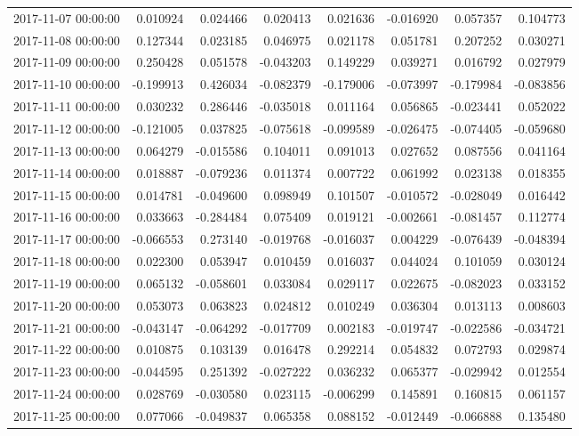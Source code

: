 \begin{tabular}{lrrrrrrr}
2017-11-07 00:00:00 & 0.010924 & 0.024466 & 0.020413 & 0.021636 & -0.016920 & 0.057357 & 0.104773 \\
2017-11-08 00:00:00 & 0.127344 & 0.023185 & 0.046975 & 0.021178 & 0.051781 & 0.207252 & 0.030271 \\
2017-11-09 00:00:00 & 0.250428 & 0.051578 & -0.043203 & 0.149229 & 0.039271 & 0.016792 & 0.027979 \\
2017-11-10 00:00:00 & -0.199913 & 0.426034 & -0.082379 & -0.179006 & -0.073997 & -0.179984 & -0.083856 \\
2017-11-11 00:00:00 & 0.030232 & 0.286446 & -0.035018 & 0.011164 & 0.056865 & -0.023441 & 0.052022 \\
2017-11-12 00:00:00 & -0.121005 & 0.037825 & -0.075618 & -0.099589 & -0.026475 & -0.074405 & -0.059680 \\
2017-11-13 00:00:00 & 0.064279 & -0.015586 & 0.104011 & 0.091013 & 0.027652 & 0.087556 & 0.041164 \\
2017-11-14 00:00:00 & 0.018887 & -0.079236 & 0.011374 & 0.007722 & 0.061992 & 0.023138 & 0.018355 \\
2017-11-15 00:00:00 & 0.014781 & -0.049600 & 0.098949 & 0.101507 & -0.010572 & -0.028049 & 0.016442 \\
2017-11-16 00:00:00 & 0.033663 & -0.284484 & 0.075409 & 0.019121 & -0.002661 & -0.081457 & 0.112774 \\
2017-11-17 00:00:00 & -0.066553 & 0.273140 & -0.019768 & -0.016037 & 0.004229 & -0.076439 & -0.048394 \\
2017-11-18 00:00:00 & 0.022300 & 0.053947 & 0.010459 & 0.016037 & 0.044024 & 0.101059 & 0.030124 \\
2017-11-19 00:00:00 & 0.065132 & -0.058601 & 0.033084 & 0.029117 & 0.022675 & -0.082023 & 0.033152 \\
2017-11-20 00:00:00 & 0.053073 & 0.063823 & 0.024812 & 0.010249 & 0.036304 & 0.013113 & 0.008603 \\
2017-11-21 00:00:00 & -0.043147 & -0.064292 & -0.017709 & 0.002183 & -0.019747 & -0.022586 & -0.034721 \\
2017-11-22 00:00:00 & 0.010875 & 0.103139 & 0.016478 & 0.292214 & 0.054832 & 0.072793 & 0.029874 \\
2017-11-23 00:00:00 & -0.044595 & 0.251392 & -0.027222 & 0.036232 & 0.065377 & -0.029942 & 0.012554 \\
2017-11-24 00:00:00 & 0.028769 & -0.030580 & 0.023115 & -0.006299 & 0.145891 & 0.160815 & 0.061157 \\
2017-11-25 00:00:00 & 0.077066 & -0.049837 & 0.065358 & 0.088152 & -0.012449 & -0.066888 & 0.135480 \\

\end{tabular}
